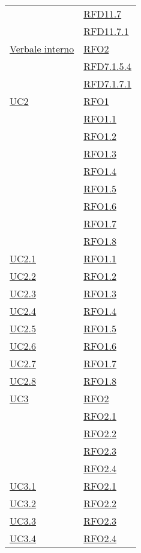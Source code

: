 \begin{longtable}{|>{\centering}m{5cm}|m{5cm}<{\centering}|}
& \hyperlink{RFD11.7}{RFD11.7}\\
& \hyperlink{RFD11.7.1}{RFD11.7.1}\\ \hline
\hyperlink{Verbale interno}{Verbale interno} & \hyperlink{RFO2}{RFO2}\\
& \hyperlink{RFD7.1.5.4}{RFD7.1.5.4}\\
& \hyperlink{RFD7.1.7.1}{RFD7.1.7.1}\\ \hline
\hyperref[UC2]{UC2} & \hyperlink{RFO1}{RFO1}\\
& \hyperlink{RFO1.1}{RFO1.1}\\
& \hyperlink{RFO1.2}{RFO1.2}\\
& \hyperlink{RFO1.3}{RFO1.3}\\
& \hyperlink{RFO1.4}{RFO1.4}\\
& \hyperlink{RFO1.5}{RFO1.5}\\
& \hyperlink{RFO1.6}{RFO1.6}\\
& \hyperlink{RFO1.7}{RFO1.7}\\
& \hyperlink{RFO1.8}{RFO1.8}\\ \hline
\hyperref[UC2.1]{UC2.1} & \hyperlink{RFO1.1}{RFO1.1}\\ \hline
\hyperref[UC2.2]{UC2.2} & \hyperlink{RFO1.2}{RFO1.2}\\ \hline
\hyperref[UC2.3]{UC2.3} & \hyperlink{RFO1.3}{RFO1.3}\\ \hline
\hyperref[UC2.4]{UC2.4} & \hyperlink{RFO1.4}{RFO1.4}\\ \hline
\hyperref[UC2.5]{UC2.5} & \hyperlink{RFO1.5}{RFO1.5}\\ \hline
\hyperref[UC2.6]{UC2.6} & \hyperlink{RFO1.6}{RFO1.6}\\ \hline
\hyperref[UC2.7]{UC2.7} & \hyperlink{RFO1.7}{RFO1.7}\\ \hline
\hyperref[UC2.8]{UC2.8} & \hyperlink{RFO1.8}{RFO1.8}\\ \hline
\hyperref[UC3]{UC3} & \hyperlink{RFO2}{RFO2}\\
& \hyperlink{RFO2.1}{RFO2.1}\\
& \hyperlink{RFO2.2}{RFO2.2}\\
& \hyperlink{RFO2.3}{RFO2.3}\\
& \hyperlink{RFO2.4}{RFO2.4}\\ \hline
\hyperref[UC3.1]{UC3.1} & \hyperlink{RFO2.1}{RFO2.1}\\ \hline
\hyperref[UC3.2]{UC3.2} & \hyperlink{RFO2.2}{RFO2.2}\\ \hline
\hyperref[UC3.3]{UC3.3} & \hyperlink{RFO2.3}{RFO2.3}\\ \hline
\hyperref[UC3.4]{UC3.4} & \hyperlink{RFO2.4}{RFO2.4}\\ \hline

\end{longtable}
